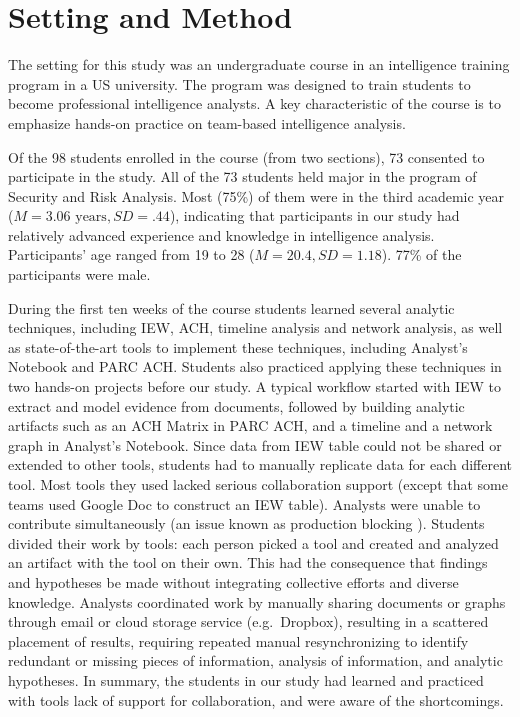 \section{Setting and Method}\label{classroom-study-settings}

The setting for this study was an undergraduate course in an intelligence
training program in a US university. The program was designed to train students
to become professional intelligence analysts. A key characteristic of the course is
to emphasize hands-on practice on team-based intelligence analysis.

Of the 98 students enrolled in the course (from
two sections), 73 consented to participate in the study. All of the 73 students
held major in the program of Security and Risk Analysis. Most (75\%) of them
were in the third academic year ($M=3.06 \text{ years}, SD=.44$), indicating that participants in
our study had relatively advanced experience and knowledge in intelligence
analysis. Participants' age ranged from 19 to 28 ($M=20.4, SD=1.18$). 77\% of the
participants were male.


During the first ten weeks of the course students learned several analytic
techniques, including IEW, ACH, timeline analysis and network analysis, as
well as state-of-the-art tools to implement these techniques, including
Analyst's Notebook and PARC ACH. Students also practiced applying these
techniques in two hands-on projects before our study. A typical workflow started
with IEW to extract and model evidence from documents, followed by building
analytic artifacts such as an ACH Matrix in PARC ACH, and a timeline and a
network graph in Analyst's Notebook. Since data from IEW table could not be
shared or extended to other tools, students had to manually replicate data for each
different tool. Most tools they used lacked serious collaboration support
(except that some teams used Google Doc to construct an IEW table). Analysts
were unable to contribute simultaneously (an issue known as production blocking
\cite{Diehl1987a}). Students divided their work by tools: each person
picked a tool and created and analyzed an artifact with the tool on their
own. This had the consequence that findings and hypotheses be made without
integrating collective efforts and diverse knowledge. Analysts coordinated work
by manually sharing documents or graphs through email or cloud storage service
(e.g.~Dropbox), resulting in a scattered placement of results, requiring
repeated manual resynchronizing to identify redundant or missing pieces of
information, analysis of information, and analytic hypotheses. In summary, the
students in our study had learned and practiced with tools lack of support for
collaboration, and were aware of the shortcomings.

